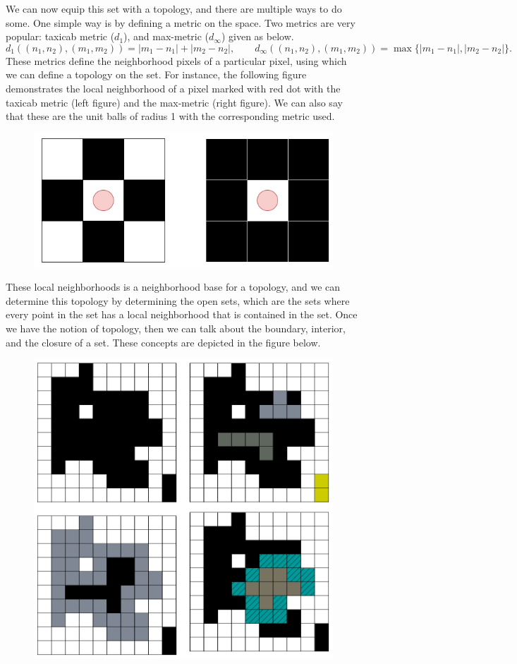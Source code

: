 \documentclass[11pt,a4paper]{article}
\newcommand{\set}[1]{\{#1\}}
\newcommand{\abs}[1]{|#1|}
\theoremstyle{definition}
\theoremstyle{remark}
\begin{document}
	We can now equip this set with a topology, and there are multiple ways to do some. One simple way is by defining a metric on the space. Two metrics are very popular: taxicab metric ($ d_1 $), and max-metric ($ d_\infty $) given as below.
	\[ d_1((n_1,n_2),(m_1,m_2)) = \abs{m_1-n_1} + \abs{m_2-n_2}, \qquad d_\infty((n_1,n_2),(m_1,m_2))=\max\set{\abs{m_1-n_1},\abs{m_2-n_2}}. \]
	These metrics define the neighborhood pixels of a particular pixel, using which we can define a topology on the set. For instance, the following figure demonstrates the local neighborhood of a pixel marked with red dot with the taxicab metric (left figure) and the max-metric (right figure). We can also say that these are the unit balls of radius 1 with the corresponding metric used.
	\begin{figure}[h!]
		\centering
		\includegraphics[width=0.5\linewidth]{images/NeighborhoodMetric}
		\label{fig:neighborhoodmetric}
	\end{figure}
	\FloatBarrier
	
	These local neighborhoods is a neighborhood base for a topology, and we can determine this topology by determining the open sets, which are the sets where every point in the set has a local neighborhood that is contained in the set. Once we have the notion of topology, then we can talk about the boundary, interior, and the closure of a set. These concepts are depicted in the figure below.
	
	\begin{figure}[h!]
		\centering
		\includegraphics[width=1\linewidth]{images/openAndClosedSets}
		\caption{}
		\label{fig:openandclosedsets}
	\end{figure}
	\FloatBarrier
	
	 
	
	
	
	
\end{document}
